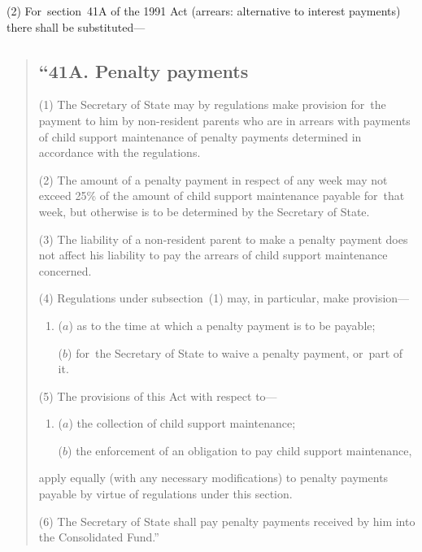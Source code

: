 \documentclass[12pt,a4paper]{article}
\begin{document}
(2) For~section~41A of the 1991 Act (arrears: alternative to interest payments) there shall be substituted—
\begin{quotation}
\subsection*{“41A. Penalty payments}

(1) The Secretary of State may by regulations make provision for~the payment to him by non-resident parents who are in arrears with payments of child support maintenance of penalty payments determined in accordance with the regulations.

(2) The amount of a penalty payment in respect of any week may not exceed 25\% of the amount of child support maintenance payable for~that week, but otherwise is to be determined by the Secretary of State.

(3) The liability of a non-resident parent to make a penalty payment does not affect his liability to pay the arrears of child support maintenance concerned.

(4) Regulations under subsection~(1)  may, in particular, make provision—
\begin{enumerate}\item[]
($a$) as to the time at which a penalty payment is to be payable;

($b$) for~the Secretary of State to waive a penalty payment, or~part of it.
\end{enumerate}

(5) The provisions of this Act with respect to—
\begin{enumerate}\item[]
($a$) the collection of child support maintenance;

($b$) the enforcement of an obligation to pay child support maintenance,
\end{enumerate}
apply equally (with any necessary modifications) to penalty payments payable by virtue of regulations under this section.

(6) The Secretary of State shall pay penalty payments received by him into the Consolidated Fund.”
\end{quotation}

\end{document}
